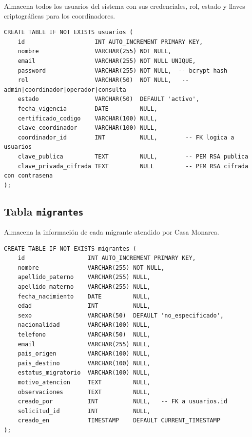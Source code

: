 \documentclass[10pt,letterpaper]{report}
\begin{document}
Almacena todos los usuarios del sistema con sus credenciales, rol, estado y llaves criptográficas para los coordinadores.

\begin{lstlisting}[style=sqlstyle, caption={Definición de la tabla usuarios}]
CREATE TABLE IF NOT EXISTS usuarios (
    id                    INT AUTO_INCREMENT PRIMARY KEY,
    nombre                VARCHAR(255) NOT NULL,
    email                 VARCHAR(255) NOT NULL UNIQUE,
    password              VARCHAR(255) NOT NULL,  -- bcrypt hash
    rol                   VARCHAR(50)  NOT NULL,   -- admin|coordinador|operador|consulta
    estado                VARCHAR(50)  DEFAULT 'activo',
    fecha_vigencia        DATE         NULL,
    certificado_codigo    VARCHAR(100) NULL,
    clave_coordinador     VARCHAR(100) NULL,
    coordinador_id        INT          NULL,        -- FK logica a usuarios
    clave_publica         TEXT         NULL,        -- PEM RSA publica
    clave_privada_cifrada TEXT         NULL         -- PEM RSA cifrada con contrasena
);
\end{lstlisting}

\subsection{Tabla \texttt{migrantes}}

Almacena la información de cada migrante atendido por Casa Monarca.

\begin{lstlisting}[style=sqlstyle, caption={Definición de la tabla migrantes}]
CREATE TABLE IF NOT EXISTS migrantes (
    id                  INT AUTO_INCREMENT PRIMARY KEY,
    nombre              VARCHAR(255) NOT NULL,
    apellido_paterno    VARCHAR(255) NULL,
    apellido_materno    VARCHAR(255) NULL,
    fecha_nacimiento    DATE         NULL,
    edad                INT          NULL,
    sexo                VARCHAR(50)  DEFAULT 'no_especificado',
    nacionalidad        VARCHAR(100) NULL,
    telefono            VARCHAR(50)  NULL,
    email               VARCHAR(255) NULL,
    pais_origen         VARCHAR(100) NULL,
    pais_destino        VARCHAR(100) NULL,
    estatus_migratorio  VARCHAR(100) NULL,
    motivo_atencion     TEXT         NULL,
    observaciones       TEXT         NULL,
    creado_por          INT          NULL,   -- FK a usuarios.id
    solicitud_id        INT          NULL,
    creado_en           TIMESTAMP    DEFAULT CURRENT_TIMESTAMP
);
\end{lstlisting}
\end{document}
